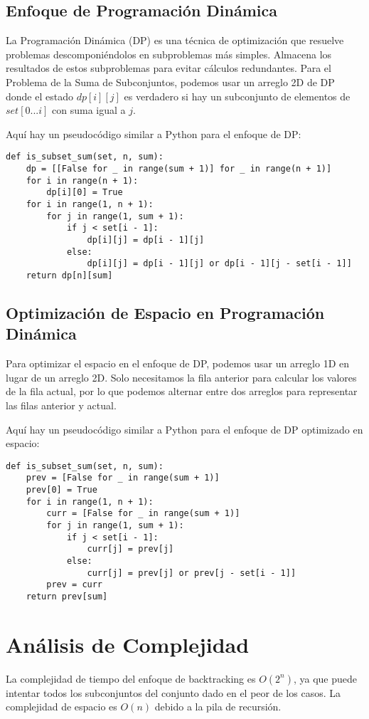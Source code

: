 \documentclass{article}
\begin{document}
\subsection{Enfoque de Programación Dinámica}
La Programación Dinámica (DP) es una técnica de optimización que resuelve problemas descomponiéndolos en subproblemas más simples. Almacena los resultados de estos subproblemas para evitar cálculos redundantes. Para el Problema de la Suma de Subconjuntos, podemos usar un arreglo 2D de DP donde el estado \( dp[i][j] \) es verdadero si hay un subconjunto de elementos de \( set[0...i] \) con suma igual a \( j \).

Aquí hay un pseudocódigo similar a Python para el enfoque de DP:

\begin{verbatim}
def is_subset_sum(set, n, sum):
    dp = [[False for _ in range(sum + 1)] for _ in range(n + 1)]
    for i in range(n + 1):
        dp[i][0] = True
    for i in range(1, n + 1):
        for j in range(1, sum + 1):
            if j < set[i - 1]:
                dp[i][j] = dp[i - 1][j]
            else:
                dp[i][j] = dp[i - 1][j] or dp[i - 1][j - set[i - 1]]
    return dp[n][sum]
\end{verbatim}

\subsection{Optimización de Espacio en Programación Dinámica}
Para optimizar el espacio en el enfoque de DP, podemos usar un arreglo 1D en lugar de un arreglo 2D. Solo necesitamos la fila anterior para calcular los valores de la fila actual, por lo que podemos alternar entre dos arreglos para representar las filas anterior y actual.

Aquí hay un pseudocódigo similar a Python para el enfoque de DP optimizado en espacio:

\begin{verbatim}
def is_subset_sum(set, n, sum):
    prev = [False for _ in range(sum + 1)]
    prev[0] = True
    for i in range(1, n + 1):
        curr = [False for _ in range(sum + 1)]
        for j in range(1, sum + 1):
            if j < set[i - 1]:
                curr[j] = prev[j]
            else:
                curr[j] = prev[j] or prev[j - set[i - 1]]
        prev = curr
    return prev[sum]
\end{verbatim}

\section{Análisis de Complejidad}
La complejidad de tiempo del enfoque de backtracking  es \( O(2^n) \), ya que puede intentar todos los subconjuntos del conjunto dado en el peor de los casos. La complejidad de espacio es \( O(n) \) debido a la pila de recursión.
\end{document}
